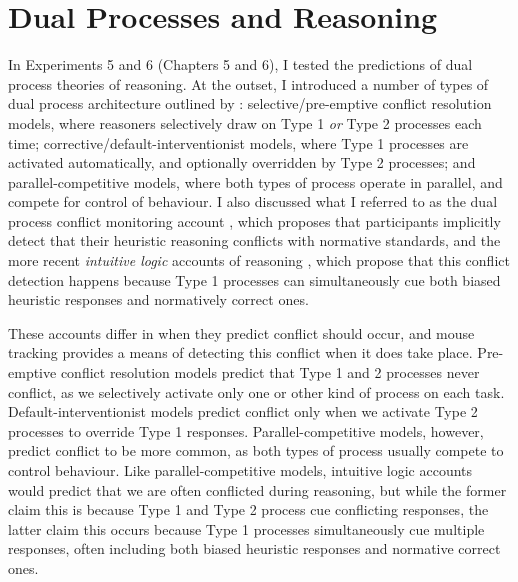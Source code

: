 
\section{Dual Processes and Reasoning}\label{sec:ch7-dualproc}

In Experiments 5 and 6 (Chapters 5 and 6),
I tested the predictions of dual process theories of reasoning.
At the outset, I introduced a number of types of dual process architecture
outlined by \citet{Evans2007a}:
selective/pre-emptive conflict resolution models,
where reasoners selectively draw on Type 1 \emph{or} Type 2 processes each time;
corrective/default-interventionist models,
where Type 1 processes are activated automatically,
and optionally overridden by Type 2 processes;
and parallel-competitive models,
where both types of process operate in parallel,
and compete for control of behaviour.
I also discussed
what I referred to as
the dual process conflict monitoring account
\citep[e.g.][]{DeNeys2008,DeNeys2008a},
which proposes that participants implicitly detect
that their heuristic reasoning conflicts with normative standards,
and the more recent \emph{intuitive logic} accounts of reasoning
\citep{DeNeys2012,DeNeys2014a,Handley2015},
which propose that this conflict detection happens because
Type 1 processes can simultaneously cue both
biased heuristic responses and normatively correct ones.

These accounts differ in when they predict conflict should occur,
and mouse tracking provides a means of detecting this conflict when it does take place.
Pre-emptive conflict resolution models predict that Type 1 and 2 processes never conflict,
as we selectively activate only one or other kind of process on each task.
Default-interventionist models predict conflict
only when we activate Type 2 processes to override Type 1 responses.
Parallel-competitive models, however, predict conflict to be more common,
as both types of process usually compete to control behaviour.
Like parallel-competitive models, intuitive logic accounts
would predict that we are often conflicted during reasoning,
but while the former claim this is because Type 1 and Type 2 process cue conflicting responses,
the latter claim this occurs because Type 1 processes simultaneously cue multiple responses,
often including both biased heuristic responses and normative correct ones.

